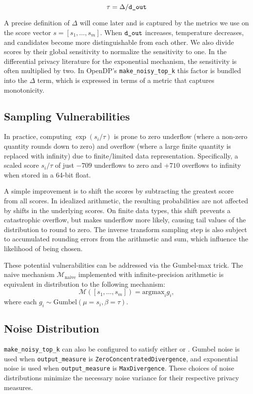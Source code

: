 \documentclass{article}
\begin{document}
\begin{equation}
    \tau = \Delta / \texttt{d\_out}
\end{equation}

A precise definition of $\Delta$ will come later and is captured by the metrics we use on the score vector $s = [s_1, \ldots, s_m]$.
When $\texttt{d\_out}$ increases, temperature decreases, and candidates become more distinguishable from each other.
We also divide scores by their global sensitivity to normalize the sensitivity to one.
In the differential privacy literature for the exponential mechanism, the sensitivity is often multiplied by two.
In OpenDP's \texttt{make\_noisy\_top\_k} this factor is bundled into the $\Delta$ term, which is expressed in terms of a metric that captures monotonicity.

\subsection{Sampling Vulnerabilities}

In practice, computing $\exp(s_i / \tau)$ is prone to
zero underflow (where a non-zero quantity rounds down to zero)
and overflow (where a large finite quantity is replaced with infinity)
due to finite/limited data representation.
Specifically, a scaled score $s_i / \tau$ of just $-709$ underflows to zero and $+710$ overflows to infinity when stored in a 64-bit float.

A simple improvement is to shift the scores by subtracting the greatest score from all scores.
In idealized arithmetic, the resulting probabilities are not affected by shifts in the underlying scores.
On finite data types, this shift prevents a catastrophic overflow, but makes underflow more likely,
causing tail values of the distribution to round to zero.
The inverse transform sampling step is also subject to accumulated rounding errors from the arithmetic and sum,
which influence the likelihood of being chosen.

These potential vulnerabilities can be addressed via the Gumbel-max trick.
The naive mechanism $\mathcal{M}_\mathrm{naive}$ implemented with infinite-precision arithmetic
is equivalent in distribution to the following mechanism:
\begin{equation}
    \mathcal{M}([s_1, \ldots, s_m]) = \mathrm{argmax}_i g_i,
\end{equation}
where each $g_i \sim \mathrm{Gumbel}(\mu = s_i, \beta = \tau)$.

\subsection{Noise Distribution}
\texttt{make\_noisy\_top\_k} can also be configured to satisfy
either  or .
Gumbel noise is used when \texttt{output\_measure} is \texttt{ZeroConcentratedDivergence},
and exponential noise is used when \texttt{output\_measure} is \texttt{MaxDivergence}.
These choices of noise distributions minimize the necessary noise variance for their respective privacy measures.
\end{document}
